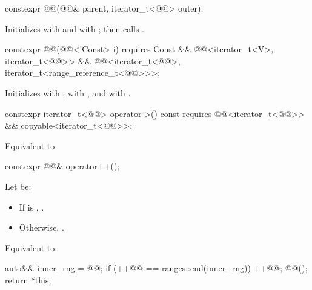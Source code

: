 %
\begin{itemdecl}
constexpr @@(@@& parent, iterator_t<@@> outer);
\end{itemdecl}

\begin{itemdescr}
\pnum
\effects
Initializes  with  and
 with ; then calls .
\end{itemdescr}

%
\begin{itemdecl}
constexpr @@(@@<!Const> i)
  requires Const &&
           @@<iterator_t<V>, iterator_t<@@>> &&
           @@<iterator_t<@@>,
                          iterator_t<range_reference_t<@@>>>;
\end{itemdecl}

\begin{itemdescr}
\pnum
\effects
Initializes  with ,
 with , and
 with .
\end{itemdescr}

%
\begin{itemdecl}
constexpr iterator_t<@@> operator->() const
  requires @@<iterator_t<@@>> && copyable<iterator_t<@@>>;
\end{itemdecl}

\begin{itemdescr}
\pnum
\effects
Equivalent to 
\end{itemdescr}

%
\begin{itemdecl}
constexpr @@& operator++();
\end{itemdecl}

\begin{itemdescr}
\pnum
Let  be:
\begin{itemize}
\item If  is , .
\item Otherwise, .
\end{itemize}

\pnum
\effects
Equivalent to:
\begin{codeblock}
auto&& inner_rng = @@;
if (++@@ == ranges::end(inner_rng)) {
  ++@@;
  @@();
}
return *this;
\end{codeblock}
\end{itemdescr}

